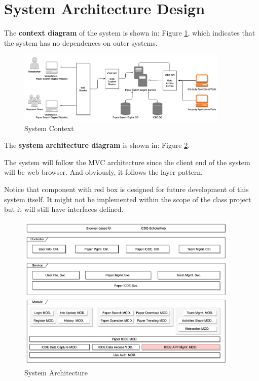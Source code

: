 \section{System Architecture Design}

The \textbf{context diagram} of the system is shown in: Figure \ref{fig:sys-context},
which indicates that the system has no dependences on outer systems.

\begin{figure}[!ht]
	\centering
	\includegraphics[width=0.9\textwidth]{./img/sys-context.png}
	\caption{System Context}
	\label{fig:sys-context}
\end{figure}

The \textbf{system architecture diagram} is shown in: Figure \ref{fig:sys-arch}.

The system will follow the MVC architecture since the client end of the system will be web browser.
And obviously, it follows the layer pattern.

Notice that component with red box is designed for future development of this system itself.
It might not be implemented within the scope of the class project but it will still have interfaces defined.

\begin{figure}[!ht]
	\centering
	\includegraphics[width=0.95\textwidth]{./img/sys-arch.jpg}
	\caption{System Architecture}
	\label{fig:sys-arch}
\end{figure}
